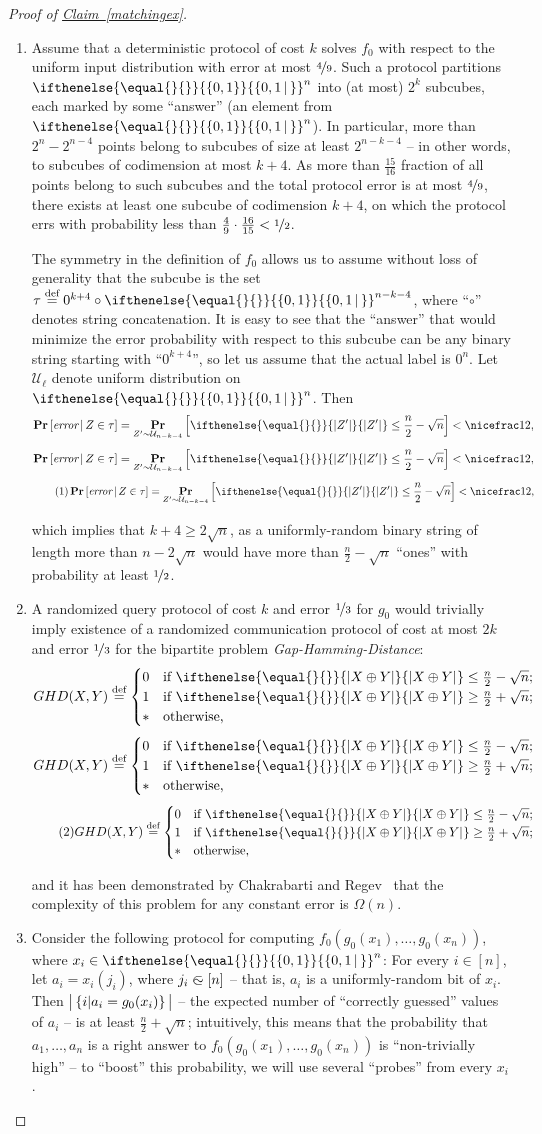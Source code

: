\documentclass[11pt]{article}
\numberwithin{equation}{section}
\theoremstyle{definition}
\theoremstyle{plain}
\newcommand{\expref}[2]{\hyperref[#2]{#1~\ref{#2}}}
\newcommand{\md}{\middle}
\newcommand{\malabel}[1]{\addtocounter{equation}{1}\tag{\theequation}\label{#1}}
\newcommand{\m}[2][]{%
\ifthenelse{\equal{}{#1}}%
{\begin{align*} #2 \end{align*}}%
{\ifthenelse{\eq<ual{P}{#1}}%
{\begingroup\allowdisplaybreaks\begin{align*} #2%
\end{align*}\endgroup}%
{\begin{align*} \malabel{#1} #2 \end{align*}}%
}%
}
\newcommand{\thrcase}[6]%
{\begin{cases} #1 &\txt{#2}\\ #3 &\txt{#4}\\ #5 &\txt{#6}\end{cases}}
\newcommand{\PRdg}[2][]{\mathop{\mathbf{Pr}}_{#1}\left[{#2}\right]}
\newcommand{\PRr}[3][]{\mathop{\mathbf{Pr}}_{#1}\left[{#2}\,\md|\,{#3}\right]}
\newcommand{\dr}{\nicefrac}
\newcommand{\sq}{\sqrt}
\newcommand{\set}[2][]{\ifthenelse{\equal{}{#1}}%
{\ensuremath{\left\{#2\right\}}}%
{\ensuremath{\left\{#2\,\md|\,#1\right\}}}}
\newcommand{\asOm}[1]{\Omega(#1)}
\newcommand{\OI}{\set{0,1}}
\newcommand{\sz}[2][]{\ifthenelse{\equal{}{#1}}%
{\ensuremath{\left|#2\right|}}%
{\ensuremath{\left|#2\right|_{#1}}}}
\newcommand{\sszz}[2]{\left|\vphantom{|_1^1}\left\{#1\md|#2\right\}\vphantom{|_1^1}\right|}
\newcommand{\txt}[1]{\textrm{#1}}  %
\newcommand{\tit}[1]{\textit{#1}}  %
\newcommand{\xor}{\oplus}
\newcommand{\deq}{\stackrel{\textrm{def}}{=}}
\newcommand{\unin}{\mathrel{\subset\mkern-13.1mu\sim}}  %
\newcommand{\dc}{,\dots,}
\newcommand{\e}{\emph}
\begin{document}
\begin{proof}[Proof of {\expref{Claim}{matchingex}}]
\begin{enumerate}
\item[(i)] Assume that a deterministic protocol of cost $k$ solves $f_0$ with respect to the uniform input distribution with error at most $\dr49$.
Such a protocol partitions $\OI^n$ into (at most)
%
$2^k$ subcubes, each marked by some ``answer'' (an element from $\OI^n$).
In particular, more than $2^n-2^{n-4}$ points belong to subcubes of size at least $2^{n-k-4}$ -- in other words, to subcubes of codimension at most $k+4$.
As more than $\frac{15}{16}$ fraction of all points belong to such subcubes and the total protocol error is at most $\dr49$, there exists at least one subcube of codimension $k+4$, on which the protocol errs with probability less than $\frac{4}{9} \cdot \frac{16}{15} < \dr12$.

The symmetry in the definition of $f_0$ allows us to assume without loss of generality that the subcube is the set $\tau\deq0^{k+4}\circ\OI^{n-k-4}$, where ``$\circ$'' denotes string concatenation.
It is easy to see that the ``answer'' that would minimize the error probability with respect to this subcube can be any binary string starting with ``$0^{k+4}$'', so let us assume that the actual label is $0^n$. Let $\mathcal{U}_{\ell}$ denote uniform distribution on $\OI^n$.
Then
\m{
  \PRr{\tit{error}}{Z\in\tau}
  =\PRdg[Z'\sim\mathcal{U}_{n-k-4}]{\sz{Z'}\le\frac n2-\sq n}
  <\dr12
,}
which implies that $k+4\ge2\sq n$, as a uniformly-random binary string of length more than $n-2\sq n$ would have more than $\frac n2-\sq n$ ``ones'' with probability at least $\dr12$.

\item[(ii)] A randomized query protocol of cost $k$ and error $\dr13$ for $g_0$ would trivially imply existence of a randomized communication protocol of cost at most $2k$ and error $\dr13$ for the bipartite problem \e{Gap-Hamming-Distance}:
\m{
  GHD(X,Y)\deq\thrcase
    {0}{if $\sz{X\xor Y}\le\frac n2-\sq n$;}
    {1}{if $\sz{X\xor Y}\ge\frac n2+\sq n$;}
    {*}{otherwise,}
}
and it has been demonstrated by Chakrabarti and Regev~\cite{CR11_An_O} that the complexity of this problem for any constant error is $\asOm n$.

\item[(iii)] Consider the following protocol for computing $f_0\left(g_0(x_1)\dc g_0(x_n)\right)$, where $x_i\in\OI^n$:
For every $i\in[n]$, let $a_i=x_i(j_i)$, where $j_i\unin[n]$ -- that is, $a_i$ is a uniformly-random bit of $x_i$.
Then $\sszz{i}{a_i=g_0(x_i)}$ -- the expected number of ``correctly guessed'' values of $a_i$ -- is at least $\frac n2+\sq n$; intuitively, this means that the probability that $a_1\dc a_n$ is a right answer to $f_0\left(g_0(x_1)\dc g_0(x_n)\right)$ is ``non-trivially high'' -- to ``boost'' this probability, we will use several ``probes'' from every $x_i$.


\end{enumerate}
\end{proof}
\end{document}
